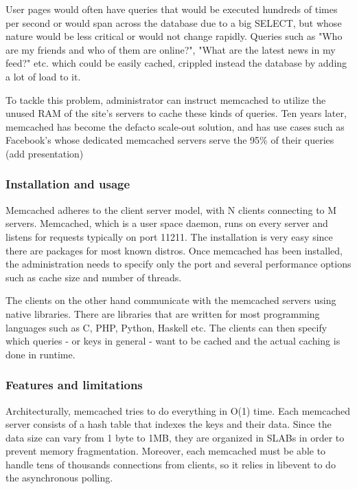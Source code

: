 User pages would often have queries that would be executed hundreds of times 
per second or would span across the database due to a big SELECT, but whose 
nature would be less critical or would not change rapidly. Queries such as "Who 
are my friends and who of them are online?", "What are the latest news in my 
feed?" etc. which could be easily cached, crippled instead the database by 
adding a lot of load to it.

To tackle this problem, administrator can instruct memcached to utilize the 
unused RAM of the site's servers to cache these kinds of queries. Ten years 
later, memcached has become the defacto scale-out solution, and has use cases 
such as Facebook's whose dedicated memcached servers serve the 95\% of their 
queries (\fixme add presentation)

\subsubsection{Installation and usage}

Memcached adheres to the client server model, with N clients connecting to M 
servers. Memcached, which is a user space daemon, runs on every server and
listens for requests typically on port 11211. The installation is very easy 
since there are packages for most known distros. Once memcached has been 
installed, the administration needs to specify only the port and several 
performance options such as cache size and number of threads.

The clients on the other hand communicate with the memcached servers using 
native libraries. There are libraries that are written for most programming 
languages such as C, PHP, Python, Haskell etc. The clients can then specify 
which queries - or keys in general - want to be cached and the actual caching 
is done in runtime.

\subsubsection{Features and limitations}

Architecturally, memcached tries to do everything in O(1) time. Each memcached 
server consists of a hash table that indexes the keys and their data. Since the 
data size can vary from 1 byte to 1MB, they are organized in SLABs in order to 
prevent memory fragmentation.  Moreover, each memcached must be able to handle 
tens of thousands connections from clients, so it relies in libevent to do the 
asynchronous polling.

